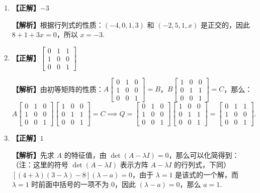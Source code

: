 \documentclass[a4paper,11pt]{ctexart}
\begin{document}
\begin{enumerate}[label=\arabic*., leftmargin=2em, itemsep=0.75em, topsep=0.5em]
  \item \textbf{【正解】}$-3$

  \textbf{【解析】}根据行列式的性质：$(-4, 0, 1, 3)$ 和 $(-2, 5, 1, x)$ 是正交的，因此 $8 + 1 + 3x = 0$，所以 $x = -3$.

  \item \textbf{【正解】}$\begin{bmatrix} 0 & 1 & 1 \\ 1 & 0 & 0 \\ 0 & 0 & 1 \end{bmatrix}$

  \textbf{【解析】}由初等矩阵的性质：$A \begin{bmatrix} 0 & 1 & 0 \\ 1 & 0 & 0 \\ 0 & 0 & 1 \end{bmatrix} = B$，$B \begin{bmatrix} 1 & 0 & 0 \\ 0 & 1 & 1 \\ 0 & 0 & 1 \end{bmatrix} = C$，那么：
  \[
    A \begin{bmatrix} 0 & 1 & 0 \\ 1 & 0 & 0 \\ 0 & 0 & 1 \end{bmatrix} \begin{bmatrix} 1 & 0 & 0 \\ 0 & 1 & 1 \\ 0 & 0 & 1 \end{bmatrix} = C
    \implies Q = \begin{bmatrix} 0 & 1 & 0 \\ 1 & 0 & 0 \\ 0 & 0 & 1 \end{bmatrix} \begin{bmatrix} 1 & 0 & 0 \\ 0 & 1 & 1 \\ 0 & 0 & 1 \end{bmatrix} = \begin{bmatrix} 0 & 1 & 1 \\ 1 & 0 & 0 \\ 0 & 0 & 1 \end{bmatrix}.
  \]

  \item \textbf{【正解】}$1$

  \textbf{【解析】}先求 $A$ 的特征值，由 $\det(A - \lambda I) = 0$，那么可以化简得到：（注：这里的符号 $\det(A - \lambda I)$ 表示方阵 $A - \lambda I$ 的行列式，下同）$[(4 + \lambda)(3 - \lambda) - 8](\lambda - a) = 0$，由于 $\lambda = 1$ 是该式的一个解，而 $\lambda = 1$ 时前面中括号的一项不为 $0$，因此 $(\lambda - a) = 0$，那么 $a = 1$.


\end{enumerate}
\end{document}
